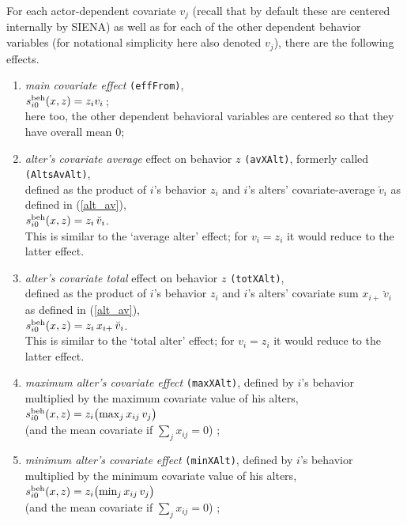 \documentclass[a4paper,fleqn,11pt]{article}
\newcommand{\+}{\, + \,}
\newcommand{\si}{{\sf SIENA}}
\newcommand{\vit}{\theenumi}
\newcounter{savenumi}
\begin{document}
\noindent
For each actor-dependent covariate $v_j$ (recall that by default these are
centered internally by \si) as well as for each of the other
dependent behavior variables (for notational simplicity here also
denoted $v_j$), there are the following effects.
\begin{enumerate}
\setcounter{enumi}{\value{savenumi}}
 \item {\em main covariate effect} \texttt{(effFrom)},\\
 $s^{\rm beh}_{i\vit}(x, z) = z_{i} v_{i}\,$;\\
 here too, the other dependent behavioral variables are centered so that they
 have overall mean 0;

\item \emph{alter's covariate average } effect on behavior $z$
 \texttt{(avXAlt)}, formerly called \texttt{(AltsAvAlt)},\\
      defined as the product of $i$'s behavior $z_i$ and
      $i$'s alters' covariate-average $\breve v_i$ as defined
      in (\ref{alt_av}),\\
       $s^{\rm beh}_{i\vit}(x, z) = z_i \, \breve v_i $.\\
      This is similar to the `average alter' effect; for
      $v_i = z_i$ it would reduce to the latter effect.

\item \emph{alter's covariate total } effect on behavior $z$
 \texttt{(totXAlt)},\\
      defined as the product of $i$'s behavior $z_i$ and
      $i$'s alters' covariate sum $x_{i+}\,\breve v_i$ as defined
      in (\ref{alt_av}),\\
       $s^{\rm beh}_{i\vit}(x, z) = z_i \, x_{i+}\, \breve v_i $.\\
      This is similar to the `total alter' effect; for
      $v_i = z_i$ it would reduce to the latter effect.


 \item {\em maximum alter's covariate effect} \texttt{(maxXAlt)},
 defined by  $i$'s
 behavior multiplied by the maximum covariate value of his alters, \\
 $s^{\rm beh}_{i\vit}(x, z) =  z_i \big( \text{max}_j \, x_{ij}\, v_j \big) $\\
 (and the mean covariate if $\sum_j x_{ij} = 0$) ;

 \item {\em minimum alter's covariate effect} \texttt{(minXAlt)},
 defined by  $i$'s
 behavior multiplied by the minimum covariate value of his alters, \\
 $s^{\rm beh}_{i\vit}(x, z) =  z_i \big( \text{min}_j \, x_{ij}\, v_j \big) $\\
 (and the mean covariate if $\sum_j x_{ij} = 0$) ;




\end{enumerate}
\end{document}
